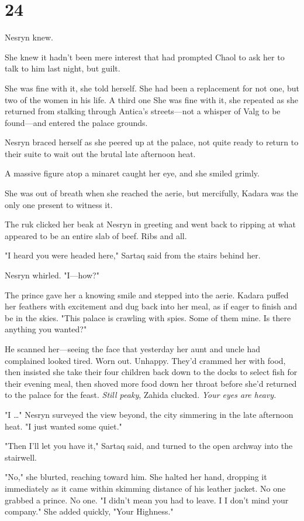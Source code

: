 
\chapter{24}

Nesryn knew.

She knew it hadn't been mere interest that had prompted Chaol to ask her to talk to him last night, but guilt.

She was fine with it, she told herself. She had been a replacement for not one, but two of the women in his life. A third one  She was fine with it, she repeated as she returned from stalking through Antica's streets---not a whisper of Valg to be found---and entered the palace grounds.

Nesryn braced herself as she peered up at the palace, not quite ready to return to their suite to wait out the brutal late afternoon heat.

A massive figure atop a minaret caught her eye, and she smiled grimly.

She was out of breath when she reached the aerie, but mercifully, Kadara was the only one present to witness it.

The ruk clicked her beak at Nesryn in greeting and went back to ripping at what appeared to be an entire slab of beef. Ribs and all.

"I heard you were headed here," Sartaq said from the stairs behind her.

Nesryn whirled. "I---how?"

The prince gave her a knowing smile and stepped into the aerie. Kadara puffed her feathers with excitement and dug back into her meal, as if eager to finish and be in the skies. "This palace is crawling with spies. Some of them mine. Is there anything you wanted?"

He scanned her---seeing the face that yesterday her aunt and uncle had complained looked tired. Worn out. Unhappy. They'd crammed her with food, then insisted she take their four children back down to the docks to select fish for their evening meal, then shoved more food down her throat before she'd returned to the palace for the feast. \emph{Still peaky}, Zahida clucked. \emph{Your eyes are heavy.}

"I \ldots" Nesryn surveyed the view beyond, the city simmering in the late afternoon heat. "I just wanted some quiet."

"Then I'll let you have it," Sartaq said, and turned to the open archway into the stairwell.

"No," she blurted, reaching toward him. She halted her hand, dropping it immediately as it came within skimming distance of his leather jacket. No one grabbed a prince. No one. "I didn't mean you had to leave. I  I don't mind your company." She added quickly, "Your Highness."


